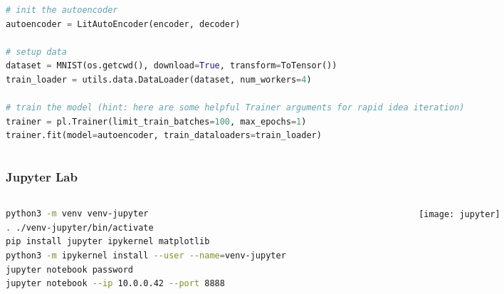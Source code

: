 \documentclass[
	notes=none,
	aspectratio=169
]{beamer}
\begin{document}
\begin{frame}[fragile]
\begin{columns}[T]
\begin{column}[T]{0.5\textwidth}
\begin{lstlisting}[language=python,firstnumber=20]
# init the autoencoder
autoencoder = LitAutoEncoder(encoder, decoder)

# setup data
dataset = MNIST(os.getcwd(), download=True, transform=ToTensor())
train_loader = utils.data.DataLoader(dataset, num_workers=4)

# train the model (hint: here are some helpful Trainer arguments for rapid idea iteration)
trainer = pl.Trainer(limit_train_batches=100, max_epochs=1)
trainer.fit(model=autoencoder, train_dataloaders=train_loader)

\end{lstlisting}

\end{column}
\end{columns}

\end{frame}
\note{
}


\begin{frame}[fragile]
\frametitle{Jupyter Lab}

\begin{columns}[T]
\begin{column}[T]{0.5\textwidth}
\setlength{\parskip}{0.5em}

\vspace{3.0cm}
\begin{lstlisting}[language=sh]
python3 -m venv venv-jupyter
. ./venv-jupyter/bin/activate
pip install jupyter ipykernel matplotlib
python3 -m ipykernel install --user --name=venv-jupyter
jupyter notebook password
jupyter notebook --ip 10.0.0.42 --port 8888
\end{lstlisting}

\end{column}
\begin{column}[T]{0.5\textwidth}
\setlength{\parskip}{0.5em}

\vspace{0.0cm}
\texttt{[image: jupyter]}

\end{column}
\end{columns}

\end{frame}
\note{
}

\end{document}
